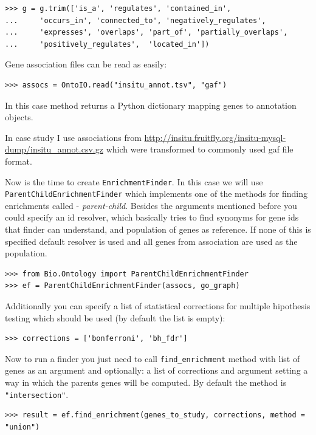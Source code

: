 \documentclass{report}
\begin{document}
\begin{verbatim}
>>> g = g.trim(['is_a', 'regulates', 'contained_in',
...     'occurs_in', 'connected_to', 'negatively_regulates',
...     'expresses', 'overlaps', 'part_of', 'partially_overlaps',
...     'positively_regulates',  'located_in'])
\end{verbatim}

Gene association files can be read as easily:

\begin{verbatim}
>>> assocs = OntoIO.read("insitu_annot.tsv", "gaf")
\end{verbatim}


In this case method returns a Python dictionary mapping genes to
annotation objects.

In case study I use associations from \url{http://insitu.fruitfly.org/insitu-mysql-dump/insitu_annot.csv.gz}
which were transformed to commonly used gaf file format.

Now is the time to create \verb|EnrichmentFinder|. In this case we will
use \verb|ParentChildEnrichmentFinder| which implements one of the methods
for finding enrichments called - \emph{parent-child}. Besides the arguments
mentioned before you could specify an id resolver, which basically tries
to find synonyms for gene ids that finder can understand, and population
of genes as reference. If none of this is specified default resolver
is used and all genes from association are used as the population.

\begin{verbatim}
>>> from Bio.Ontology import ParentChildEnrichmentFinder
>>> ef = ParentChildEnrichmentFinder(assocs, go_graph)
\end{verbatim}

Additionally you can specify a list of statistical corrections for multiple
hipothesis testing which should be used (by default the list is empty):

\begin{verbatim}
>>> corrections = ['bonferroni', 'bh_fdr']
\end{verbatim}

Now to run a finder you just need to call \verb|find_enrichment| method with list
of genes as an argument and optionally: a list of corrections and argument
setting a way in which the parents genes will be computed. By default the method
is \verb|"intersection"|. 

\begin{verbatim}
>>> result = ef.find_enrichment(genes_to_study, corrections, method =  "union")
\end{verbatim}
\end{document}
